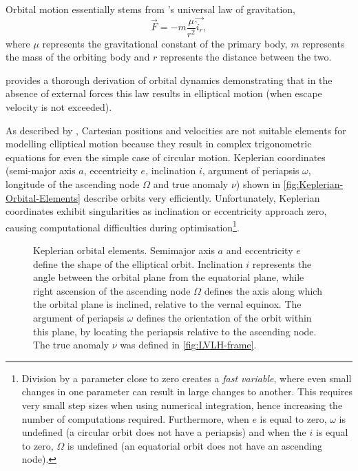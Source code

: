 Orbital motion essentially stems from \textcite{Newton1687}'s universal law of gravitation, 
\begin{equation}
\vec{F}=-m\frac{\mu}{r^{2}}\vec{\hat{i}_{r}} \label{eq:Fgravity},
\end{equation}
where $\mu$ represents the gravitational constant of the primary body, $m$  represents the mass of the orbiting body and $r$ represents the distance between the two.
 
\textcite{Kaplan1976} provides a thorough derivation of orbital dynamics demonstrating that in the absence of external forces this law results in elliptical motion (when escape velocity is not exceeded). %

As described by \textcite{Letterio_thesis}, Cartesian positions and velocities are not suitable elements for modelling elliptical motion because they result in complex trigonometric equations for even the simple case of circular motion. Keplerian coordinates (semi-major axis $a$, eccentricity $e$, inclination $i$, argument of periapsis $\omega$, longitude of the ascending node $\Omega$ and true anomaly $\nu$) shown in \autoref{fig:Keplerian-Orbital-Elements} describe orbits very efficiently. Unfortunately, Keplerian coordinates exhibit singularities as inclination or eccentricity approach zero, causing computational difficulties during optimisation\footnote{Division by a parameter close to zero creates a \emph{fast variable}, where even small changes in one parameter can result in large changes to another. This requires very small step sizes when using numerical integration, hence increasing the number of computations required. Furthermore, when $e$ is equal to zero, $\omega$ is undefined (a circular orbit does not have a periapsis) and when the $i$ is equal to zero, $\Omega$ is undefined (an equatorial orbit does not have an ascending node).}.

\begin{figure}[t]
\centering
\def\svgwidth{0.8\textwidth}

\caption{Keplerian orbital elements. Semimajor axis $a$ and eccentricity $e$ define the shape of the elliptical orbit. Inclination $i$ represents the angle between the orbital plane from the equatorial plane, while right ascension of the ascending node $\Omega$ defines the axis along which the orbital plane is inclined, relative to the vernal equinox. The argument of periapsis $\omega$ defines the orientation of the orbit within this plane, by locating the periapsis relative to the ascending node. The true anomaly $\nu$ was defined in \autoref{fig:LVLH-frame}. %
} \label{fig:Keplerian-Orbital-Elements}
\end{figure}


